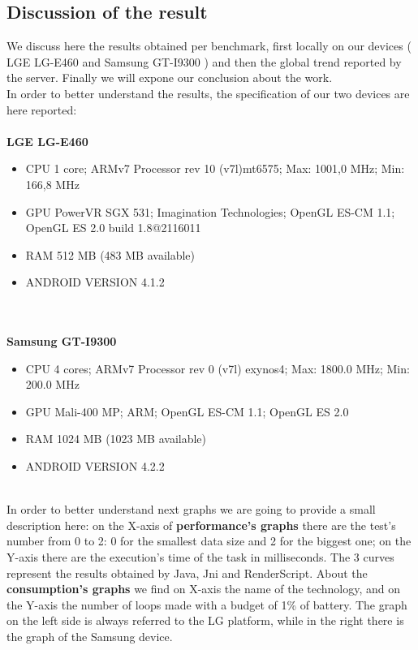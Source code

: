 \documentclass[11pt,english]{article}
\begin{document}
\subsection{Discussion of the result}
We discuss here the results obtained per benchmark,  first locally on our devices ( LGE LG-E460 and Samsung GT-I9300 ) and then the global trend reported by the server. Finally we will expone our conclusion about the work.\\In order to better understand the results, the specification of our two devices are here reported:\\\\\textbf{LGE LG-E460}
\begin{itemize}
\item CPU 1 core; ARMv7 Processor rev 10 (v7l)mt6575; Max: 1001,0 MHz; Min: 166,8 MHz
\item GPU PowerVR SGX 531; Imagination Technologies; OpenGL ES-CM 1.1; OpenGL ES 2.0 build 1.8@2116011
\item RAM 512 MB (483 MB available)
\item ANDROID VERSION 4.1.2
\end{itemize}\\\\
\textbf{Samsung GT-I9300}
\begin{itemize}
\item CPU 4 cores; ARMv7 Processor rev 0 (v7l) exynos4; Max: 1800.0 MHz; Min: 200.0 MHz
\item GPU Mali-400 MP; ARM; OpenGL ES-CM 1.1; OpenGL ES 2.0
\item RAM 1024 MB (1023 MB available)
\item ANDROID VERSION 4.2.2
\end{itemize}
\\In order to better understand next graphs we are going to provide a small description here: on the X-axis of \textbf{performance's graphs} there are the test's number from 0 to 2: 0 for the smallest data size and 2 for the biggest one; on the Y-axis there are the execution's time of the task in milliseconds. The 3 curves represent the results obtained by Java, Jni and RenderScript.
About the \textbf{consumption's graphs} we find on X-axis the name of the technology, and on the Y-axis the number of loops made with a budget of 1\% of battery. The graph on the left side is always referred to the LG platform, while in the right there is the graph of the Samsung device.
\end{document}
